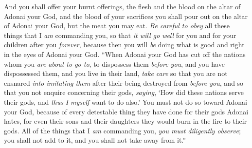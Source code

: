 \begin{biblechapter}
\verse And you shall offer your burnt offerings, the flesh and the blood on the altar of Adonai your God, and the blood of your sacrifices you shall pour out on the altar of Adonai your God, but the meat you may eat.
\verse \textit{Be careful to obey} all these things that I \textit{am} commanding you, so that \textit{it will go well} for you and for your children after you \textit{forever}, because then you will \textit{be} doing what is good and right in the eyes of Adonai your God.
\verse “When Adonai your God has cut off the nations whom you \textit{are} \textit{about to go to}, to dispossess them \textit{before you}, and you have dispossessed them, and you live in their land,
\verse \textit{take care} so that you are not ensnared \textit{into imitating them} after their being destroyed from \textit{before you}, and so that you not enquire concerning their gods, \textit{saying}, ‘How did these nations serve their gods, and \textit{thus} \textit{I myself} want to do also.’
\verse You must not do so toward Adonai your God, because of every detestable thing they have done for their gods Adonai hates, for even their sons and their daughters they would burn in the fire to their gods.
\verse  All of the things that I \textit{am} commanding you, \textit{you must diligently observe}; you shall not add to it, and you shall not take away from it.”
\end{biblechapter}

